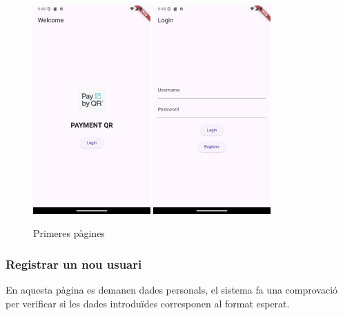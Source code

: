 \documentclass[a4paper,12pt,twoside]{ThesisStyle}
\begin{document}
\begin{figure}[h]
    \centering
    \includegraphics[width=0.4\textwidth]{imatges/welcomepage.png}
    \includegraphics[width=0.4\textwidth]{imatges/login.png}
    \caption{Primeres pàgines}
    \label{fig: Primeres pàgines}
\end{figure}

\clearpage
\subsubsection{Registrar un nou usuari}
\label{subsubsec: Registrar un nou usuari}

En aquesta pàgina es demanen dades personals, el sistema fa una comprovació per verificar si les dades introduïdes corresponen al format esperat.\\
\end{document}
